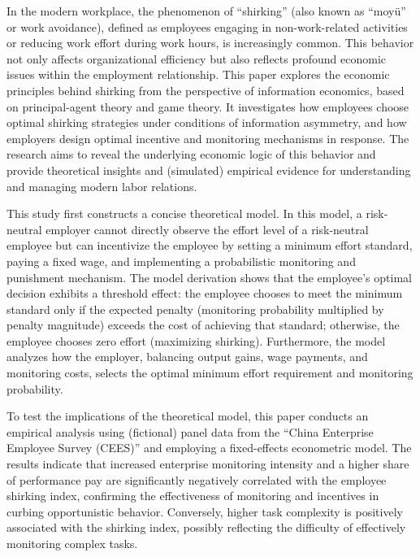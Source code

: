 \begin{eabstract}

	In the modern workplace, the phenomenon of \enquote{shirking} (also known as \enquote{moyü} or work avoidance), defined as employees engaging in non-work-related activities or reducing work effort during work hours, is increasingly common. This behavior not only affects organizational efficiency but also reflects profound economic issues within the employment relationship. This paper explores the economic principles behind {shirking} from the perspective of {information economics}, based on {principal-agent theory} and {game theory}. It investigates how employees choose optimal {shirking} strategies under conditions of {information asymmetry}, and how employers design optimal {incentive} and {monitoring} mechanisms in response. The research aims to reveal the underlying economic logic of this behavior and provide theoretical insights and (simulated) empirical evidence for understanding and managing modern labor relations.

	This study first constructs a concise theoretical model. In this model, a risk-neutral employer cannot directly observe the effort level of a risk-neutral employee but can incentivize the employee by setting a minimum effort standard, paying a fixed wage, and implementing a probabilistic {monitoring} and punishment mechanism. The model derivation shows that the employee's optimal decision exhibits a threshold effect: the employee chooses to meet the minimum standard only if the expected penalty (monitoring probability multiplied by penalty magnitude) exceeds the cost of achieving that standard; otherwise, the employee chooses zero effort (maximizing shirking). Furthermore, the model analyzes how the employer, balancing output gains, wage payments, and monitoring costs, selects the optimal minimum effort requirement and monitoring probability.

	To test the implications of the theoretical model, this paper conducts an empirical analysis using (fictional) panel data from the \enquote{China Enterprise Employee Survey (CEES)} and employing a fixed-effects econometric model. The results indicate that increased enterprise {monitoring} intensity and a higher share of {performance pay} are significantly negatively correlated with the employee shirking index, confirming the effectiveness of {monitoring} and {incentives} in curbing opportunistic behavior. Conversely, higher task complexity is positively associated with the shirking index, possibly reflecting the difficulty of effectively monitoring complex tasks.


\end{eabstract}
